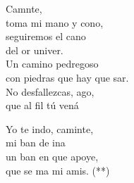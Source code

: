 \begin{cancion}[Caminante][]%
	Camnte,\\
	toma mi mano y cono,\\
	seguiremos el cano\\
	del or univer.\\
	\jump
Un camino pedregoso\\
	con piedras que hay que sar.\\
	No desfallezcas, ago,\\
	que al fil tú vená \jump\\
	\begin{chorus}%
		Yo te indo, caminte,\\
		mi ban de ina\\
		un ban en que apoye,\\
		que se ma mi amis. (**)\jump\\
	\end{chorus}%
\end{cancion}%
